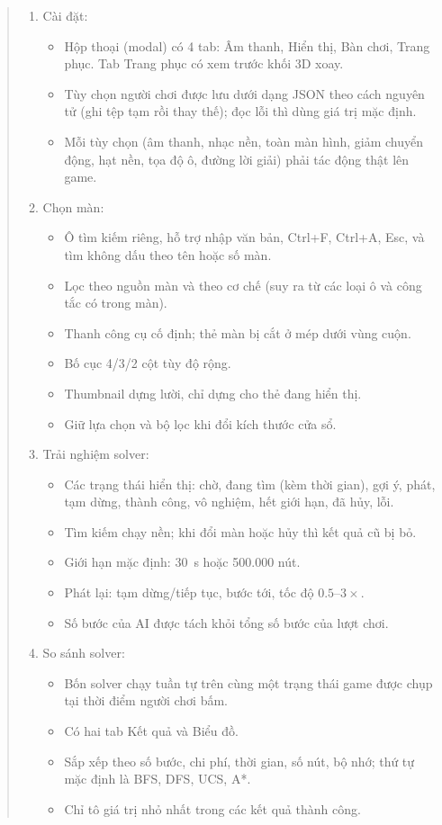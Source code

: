 \begin{quote}
\begin{enumerate}[label=\Alph*.]
  \item Cài đặt:
  \begin{itemize}
    \item Hộp thoại (modal) có 4 tab: Âm thanh, Hiển thị, Bàn chơi, Trang phục. Tab Trang phục có xem trước khối 3D xoay.
    \item Tùy chọn người chơi được lưu dưới dạng JSON theo cách nguyên tử (ghi tệp tạm rồi thay thế); đọc lỗi thì dùng giá trị mặc định.
    \item Mỗi tùy chọn (âm thanh, nhạc nền, toàn màn hình, giảm chuyển động, hạt nền, tọa độ ô, đường lời giải) phải tác động thật lên game.
  \end{itemize}

  \item Chọn màn:
  \begin{itemize}
    \item Ô tìm kiếm riêng, hỗ trợ nhập văn bản, Ctrl+F, Ctrl+A, Esc, và tìm không dấu theo tên hoặc số màn.
    \item Lọc theo nguồn màn và theo cơ chế (suy ra từ các loại ô và công tắc có trong màn).
    \item Thanh công cụ cố định; thẻ màn bị cắt ở mép dưới vùng cuộn.
    \item Bố cục 4/3/2 cột tùy độ rộng.
    \item Thumbnail dựng lười, chỉ dựng cho thẻ đang hiển thị.
    \item Giữ lựa chọn và bộ lọc khi đổi kích thước cửa sổ.
  \end{itemize}

  \item Trải nghiệm solver:
  \begin{itemize}
    \item Các trạng thái hiển thị: chờ, đang tìm (kèm thời gian), gợi ý, phát, tạm dừng, thành công, vô nghiệm, hết giới hạn, đã hủy, lỗi.
    \item Tìm kiếm chạy nền; khi đổi màn hoặc hủy thì kết quả cũ bị bỏ.
    \item Giới hạn mặc định: 30~s hoặc 500.000 nút.
    \item Phát lại: tạm dừng/tiếp tục, bước tới, tốc độ $0.5$--$3\times$.
    \item Số bước của AI được tách khỏi tổng số bước của lượt chơi.
  \end{itemize}

  \item So sánh solver:
  \begin{itemize}
    \item Bốn solver chạy tuần tự trên cùng một trạng thái game được chụp tại thời điểm người chơi bấm.
    \item Có hai tab Kết quả và Biểu đồ.
    \item Sắp xếp theo số bước, chi phí, thời gian, số nút, bộ nhớ; thứ tự mặc định là BFS, DFS, UCS, A*.
    \item Chỉ tô giá trị nhỏ nhất trong các kết quả thành công.
  \end{itemize}
\end{enumerate}
\end{quote}

